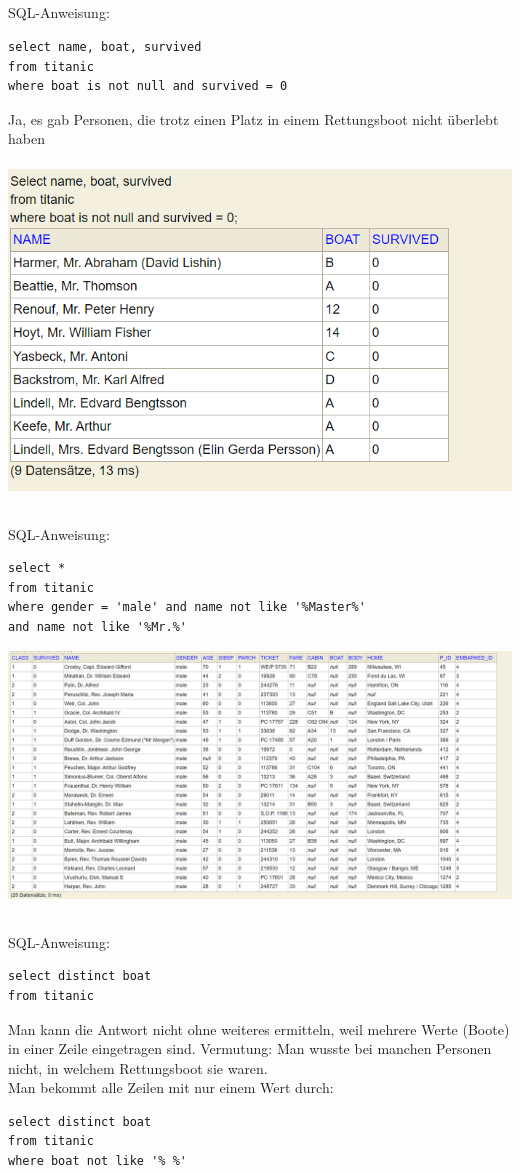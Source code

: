\documentclass[a4paper, 11pt, titlepage]{article}
\begin{document}
\subsection{}
SQL-Anweisung:
\begin{lstlisting}[style = sql]
select name, boat, survived
from titanic
where boat is not null and survived = 0
\end{lstlisting}
Ja, es gab Personen, die trotz einen Platz in einem Rettungsboot nicht überlebt haben\\
\\
\includegraphics [width = 10 cm] {i}
\newpage
\subsection{}
SQL-Anweisung:
\begin{lstlisting}[style = sql]
select *
from titanic
where gender = 'male' and name not like '%Master%' 
and name not like '%Mr.%'
\end{lstlisting}
\includegraphics [width = 15 cm] {j}
\subsection{}
SQL-Anweisung:
\begin{lstlisting}[style = sql]
select distinct boat
from titanic
\end{lstlisting}
Man kann die Antwort nicht ohne weiteres ermitteln, weil mehrere Werte (Boote) in einer Zeile eingetragen sind. Vermutung: Man wusste bei manchen Personen nicht, in welchem Rettungsboot sie waren.\\
Man bekommt alle Zeilen mit nur einem Wert durch:\\
\begin{lstlisting}[style = sql]
select distinct boat
from titanic
where boat not like '% %'
\end{lstlisting}
\end{document}
